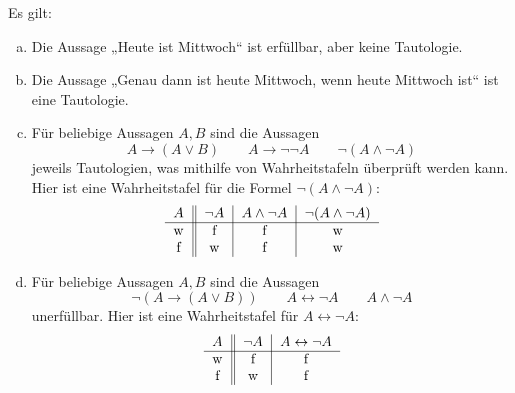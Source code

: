 \begin{bsp}
 Es gilt:
 \begin{enumerate}[a)]
  \item Die Aussage „Heute ist Mittwoch“ ist erfüllbar, aber keine Tautologie.
  \item Die Aussage „Genau dann ist heute Mittwoch, wenn heute Mittwoch ist“ ist eine Tautologie.
\item Für beliebige Aussagen $A,B$ sind die Aussagen
\[ A\to (A\lor B) \qquad A\to \neg\neg A \qquad \neg(A\land \neg A) \]
jeweils Tautologien, was mithilfe von Wahrheitstafeln überprüft werden kann. Hier ist eine Wahrheitstafel für die Formel $\neg(A\land\neg A)$:
 		\[\begin{tabular}{c||c|c|c}
			$A$ &  $\neg A$ & $A\land \neg A$ & $\neg(A\land \neg A)$ \\
			\hline
			w&f&f&w\\
			f&w&f&w
		\end{tabular}\]
\item Für beliebige Aussagen $A,B$ sind die Aussagen
\[  \neg(A\to (A\lor B)) \qquad A \leftrightarrow \neg A \qquad A\land \neg A\]
unerfüllbar. Hier ist eine Wahrheitstafel für $A\leftrightarrow \neg A$:
 		\[\begin{tabular}{c||c|c}
			$A$ &  $\neg A$ & $A \leftrightarrow \neg A$ \\
			\hline
			w&f&f\\
			f&w&f
		\end{tabular}\]
 \end{enumerate}
 \end{bsp}
 
 
 
